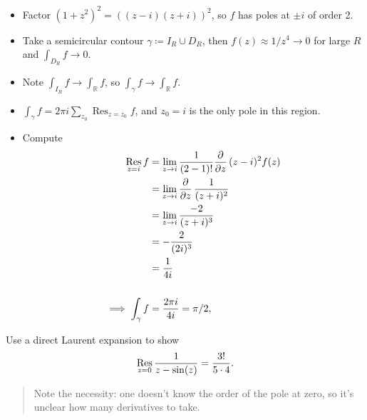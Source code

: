 \begin{solution}

\envlist

\begin{itemize}
\tightlist
\item
  Factor \((1+z^2)^2 = ((z-i)(z+i))^2\), so \(f\) has poles at \(\pm i\)
  of order 2.
\item
  Take a semicircular contour \(\gamma \coloneqq I_R \cup D_R\), then
  \(f(z) \approx 1/z^4 \to 0\) for large \(R\) and
  \(\int_{D_R} f \to 0\).
\item
  Note \(\int_{I_R} f \to \int_{\mathbb{R}}f\), so
  \(\int_\gamma f \to \int_{\mathbb{R}}f\).
\item
  \(\int_\gamma f = 2\pi i \sum_{z_0} \mathop{\mathrm{Res}}_{z=z_0} f\),
  and \(z_0 = i\) is the only pole in this region.
\item
  Compute
  \begin{align*}
  \mathop{\mathrm{Res}}_{z=i} f 
  &= \lim_{z\to i} {1\over (2-1)!} {\frac{\partial }{\partial z}\,} (z-i)^2 f(z) \\
  &= \lim_{z\to i} {\frac{\partial }{\partial z}\,} {1\over (z+i)^2 } \\
  &= \lim_{z\to i} {-2 \over (z+i)^3 } \\
  &= -{2 \over (2i)^3 } \\
  &= {1\over 4i} \\ \\
  \implies
  \int_\gamma f &= {2\pi i \over 4i} = \pi/2
  ,\end{align*}
\end{itemize}

\end{solution}

\begin{exercise}[?]

Use a direct Laurent expansion to show
\begin{align*}
\mathop{\mathrm{Res}}_{z=0} {1\over z-\sin(z)} = {3! \over 5\cdot 4}
.\end{align*}

\begin{quote}
Note the necessity: one doesn't know the order of the pole at zero, so
it's unclear how many derivatives to take.
\end{quote}

\end{exercise}

